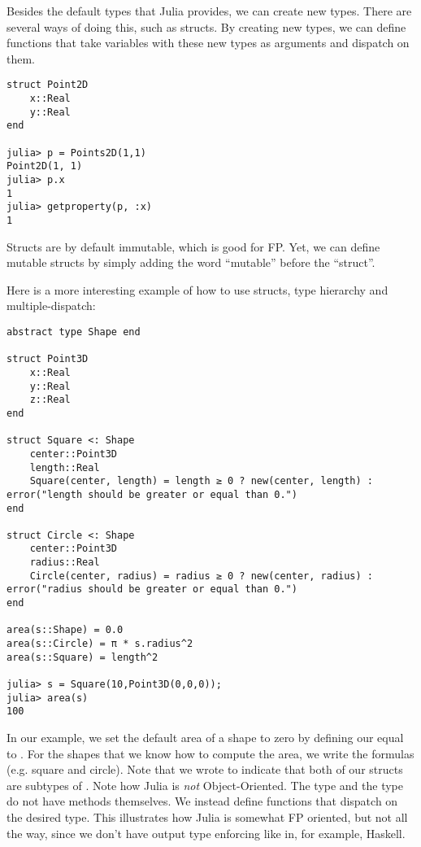Besides the default types that Julia provides, we can create new types.
There are several ways of doing this, such as structs. By creating new types,
we can define functions that take variables with these new types as arguments
and dispatch on them.

\begin{lstlisting}[language=JuliaLocal, style=julia, texcl=true]
struct Point2D
    x::Real
    y::Real
end

julia> p = Points2D(1,1)
Point2D(1, 1)
julia> p.x
1
julia> getproperty(p, :x)
1
\end{lstlisting}

Structs are by default immutable, which is good for FP. Yet, we can define mutable structs by simply
adding the word ``mutable'' before the ``struct''.

Here is a more interesting example of how to use structs, type hierarchy and multiple-dispatch:

\begin{lstlisting}[language=JuliaLocal, style=julia, texcl=true]
abstract type Shape end

struct Point3D
    x::Real
    y::Real
    z::Real
end

struct Square <: Shape
    center::Point3D
    length::Real
    Square(center, length) = length ≥ 0 ? new(center, length) : error("length should be greater or equal than 0.")
end

struct Circle <: Shape
    center::Point3D
    radius::Real
    Circle(center, radius) = radius ≥ 0 ? new(center, radius) : error("radius should be greater or equal than 0.")
end

area(s::Shape) = 0.0
area(s::Circle) = π * s.radius^2
area(s::Square) = length^2

julia> s = Square(10,Point3D(0,0,0));
julia> area(s)
100
\end{lstlisting}
In our example, we set the default area of a shape to zero by defining our  equal
to . For the
shapes that we know how to compute the area, we write the formulas (e.g. square and circle). Note that
we wrote  to indicate that both of our structs are subtypes of .
Note how Julia is \textit{not} Object-Oriented. The type  and the type 
do not have methods themselves. We instead define functions that dispatch on the desired type.
This illustrates how Julia is somewhat FP oriented, but not all the way, since we don't have
output type enforcing like in, for example, Haskell.


